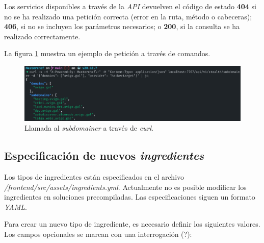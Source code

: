 Los servicios disponibles a través de la \textit{API} devuelven el código de estado \textbf{404} si no se ha realizado una petición correcta (error en la ruta, método o cabeceras); \textbf{406}, si no se incluyen los parámetros necesarios; o \textbf{200}, si la consulta se ha realizado correctamente.\sn

La figura \ref{fig:apicall} muestra un ejemplo de petición a través de comandos.\sn

\begin{figure}[H]
    \centering
    \includegraphics[width=15cm]{img/tables/44_API-Subdomainer.png}
    \caption{Llamada al \textit{subdomainer} a través de \textit{curl}.}
    \label{fig:apicall}
\end{figure}

\newpage

\subsection{Especificación de nuevos \textit{ingredientes}} \label{sub:ingredientspec}

Los tipos de ingredientes están especificados en el archivo \textit{/frontend/src/assets/ingredients.yml}. Actualmente no es posible modificar los ingredientes en soluciones precompiladas. Las especificaciones siguen un formato \textit{YAML}.\sn

Para crear un nuevo tipo de ingrediente, es necesario definir los siguientes valores. Los campos opcionales se marcan con una interrogación (?):\sn

